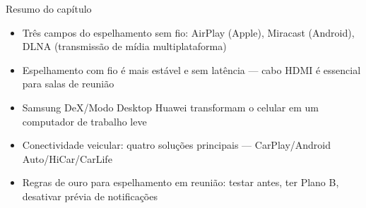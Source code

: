 \begin{tcbsummary}{Resumo do capítulo}
\begin{itemize}
  \item Três campos do espelhamento sem fio: AirPlay (Apple), Miracast (Android), DLNA (transmissão de mídia multiplataforma)
  \item Espelhamento com fio é mais estável e sem latência — cabo HDMI é essencial para salas de reunião
  \item Samsung DeX/Modo Desktop Huawei transformam o celular em um computador de trabalho leve
  \item Conectividade veicular: quatro soluções principais — CarPlay/Android Auto/HiCar/CarLife
  \item Regras de ouro para espelhamento em reunião: testar antes, ter Plano B, desativar prévia de notificações
\end{itemize}

\end{tcbsummary}
